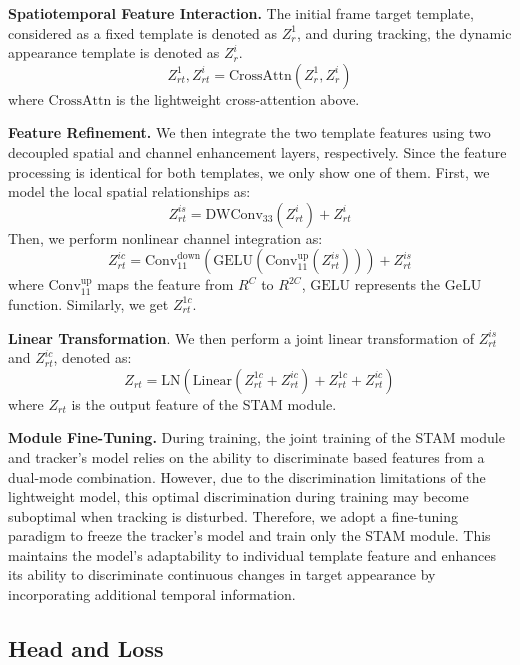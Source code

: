 \textbf{Spatiotemporal Feature Interaction.} The initial frame target template, considered as a fixed template is denoted as $Z_{r}^{1}$, and during tracking, the dynamic appearance template is denoted as $Z_{r}^{i}$.
\begin{equation}
    Z_{rt}^{1}, Z_{rt}^{i} = \text{CrossAttn}(Z_{r}^{1}, Z_{r}^{i})
\end{equation}
where $\text{CrossAttn}$ is the lightweight cross-attention above.

\textbf{Feature Refinement.} We then integrate the two template features using two decoupled spatial and channel enhancement layers, respectively. Since the feature processing is identical for both templates, we only show one of them. First, we model the local spatial relationships as:
\begin{equation}
    Z_{rt}^{is} = \text{DWConv}_{33}(Z_{rt}^{i})+Z_{rt}^{i}
\end{equation}
Then, we perform nonlinear channel integration as:
\begin{equation}
    Z_{rt}^{ic} = \text{Conv}_{11}^\text{down}(\text{GELU}(\text{Conv}_{11}^\text{up}(Z_{rt}^{is})))+Z_{rt}^{is}
\end{equation}
where $\text{Conv}_{11}^\text{up}$ maps the feature from $R^{C}$ to $R^{2C}$, $\text{GELU}$ represents the GeLU~\cite{gelu} function. Similarly, we get $Z_{rt}^{1c}$.

\textbf{Linear Transformation}. We then perform a joint linear transformation of $Z_{rt}^{is}$ and $Z_{rt}^{ic}$, denoted as:
\begin{equation}
    Z_{rt} = \text{LN}(\text{Linear}(Z_{rt}^{1c}+Z_{rt}^{ic})+Z_{rt}^{1c}+Z_{rt}^{ic})
\end{equation}
where $Z_{rt}$ is the output feature of the STAM module.

\textbf{Module Fine-Tuning.} During training, the joint training of the STAM module and tracker's model relies on the ability to discriminate based features from a dual-mode combination. However, due to the discrimination limitations of the lightweight model, this optimal discrimination during training may become suboptimal when tracking is disturbed. Therefore, we adopt a fine-tuning paradigm to freeze the tracker's model and train only the STAM module. This maintains the model's adaptability to individual template feature and enhances its ability to discriminate continuous changes in target appearance by incorporating additional temporal information.

\subsection{Head and Loss}
 
